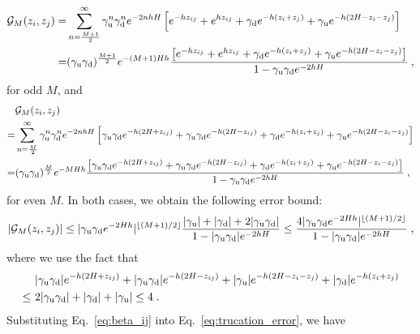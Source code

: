 \begin{equation}
    \begin{split}
        \mathcal{G}_{M}(z_i,z_j) = & \sum_{n = \frac{M + 1}{2}}^{\infty} \gamma_{\text{u}}^n \gamma_{\text{d}}^n e^{-2nhH} \left[ e^{- h z_{ij}} + e^{h z_{ij}} + \gamma_{\text{d}} e^{- h (z_i + z_j)} + \gamma_{\text{u}} e^{- h (2 H  - z_i - z_j)}\right] \\
        = & (\gamma_{\text{u}} \gamma_{\text{d}})^{\frac{M + 1}{2}} e^{- (M +1) H h} \frac{\left[e^{-h z_{ij}} + e^{h z_{ij}} + \gamma_{\text{d}} e^{- h (z_i + z_j)} + \gamma_{\text{u}} e^{- h (2 H - z_i - z_j)} \right] }{1 - \gamma_{\text{u}} \gamma_{\text{d}} e^{-2hH}} \;,
    \end{split}
\end{equation}
for odd $M$, and 
\begin{equation}
    \begin{split}
        & \mathcal{G}_M(z_i,z_j) \\
        = & \sum_{n = \frac{M}{2}}^{\infty}  \gamma_{\text{u}}^n \gamma_{\text{d}}^n e^{- 2nhH} \left[  \gamma_{\text{u}} \gamma_{\text{d}} e^{- h (2 H  + z_{ij})} + \gamma_{\text{u}} \gamma_{\text{d}}  e^{- h (2 H  - z_{ij})} + \gamma_{\text{d}} e^{- h (z_i + z_j)} + \gamma_{\text{u}} e^{- h (2H  - z_i - z_j)} \right] \\
        = & (\gamma_{\text{u}} \gamma_{\text{d}})^{\frac{M}{2}} e^{- M H h} \frac{\left[ \gamma_{\text{u}} \gamma_{\text{d}} e^{- h (2 H + z_{ij})} + \gamma_{\text{u}} \gamma_{\text{d}} e^{- h (2H - z_{ij})} + \gamma_{\text{d}} e^{ - h (z_i + z_j)} + \gamma_{\text{u}} e^{-h (2 H - z_i - z_j)} \right]}{1 - \gamma_{\text{u}} \gamma_{\text{d}} e^{-2hH}}  \;,
    \end{split}
\end{equation}
for even $M$. In both cases, we obtain the following error bound:
\begin{equation}\label{eq:beta_ij}
    \lvert \mathcal{G}_{M}(z_i,z_j) \rvert \leq \lvert\gamma_{\text{u}} \gamma_{\text{d}} e^{- 2 H h}\rvert^{\lfloor{(M+1)/2}\rfloor} \frac{\lvert\gamma_{\text{u}}\rvert + \lvert\gamma_{\text{d}}\rvert + 2 \lvert\gamma_{\text{u}} \gamma_{\text{d}}\rvert}{1 - \lvert\gamma_{\text{u}} \gamma_{\text{d}}\rvert e^{-2hH}} \leq \frac{4 \lvert\gamma_{\text{u}} \gamma_{\text{d}} e^{- 2 H h}\rvert^{\lfloor{(M+1)/2}\rfloor}}{1 - \lvert\gamma_{\text{u}} \gamma_{\text{d}}\rvert e^{-2hH}} \;,
\end{equation}
where we use the fact that 
\begin{equation}
    \begin{split}
        & ~ \lvert\gamma_{\text{u}} \gamma_{\text{d}}\rvert e^{-h(2 H + z_{ij})} + \lvert\gamma_{\text{u}} \gamma_{\text{d}}\rvert e^{ - h (2 H - z_{ij})} + \lvert\gamma_{\text{u}}\rvert e^{- h (2 H - z_i - z_j)} + \lvert\gamma_{\text{d}}\rvert e^{- h (z_i + z_j)} \\
        \leq & ~ 2 \lvert\gamma_{\text{u}} \gamma_{\text{d}}\rvert +\lvert\gamma_{\text{d}}\rvert + \lvert\gamma_{\text{u}}\rvert \leq 4 \;.
    \end{split}
\end{equation}
Substituting Eq.~\eqref{eq:beta_ij} into Eq.~\eqref{eq:trucation_error}, we have

